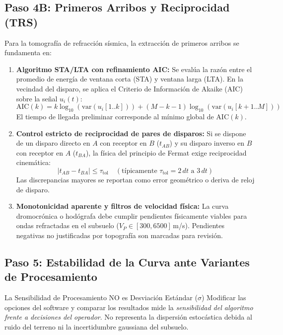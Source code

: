 \documentclass[11pt,a4paper]{article}
\begin{document}
\subsection{Paso 4B: Primeros Arribos y Reciprocidad (TRS)}
Para la tomografía de refracción sísmica, la extracción de primeros arribos se fundamenta en:
\begin{enumerate}
    \item \textbf{Algoritmo STA/LTA con refinamiento AIC:}
    Se evalúa la razón entre el promedio de energía de ventana corta (STA) y ventana larga (LTA). En la vecindad del disparo, se aplica el Criterio de Información de Akaike (AIC) sobre la señal $u_i(t)$:
    \begin{equation}
        \text{AIC}(k) = k \log_{10}(\text{var}(u_i[1..k])) + (M - k - 1) \log_{10}(\text{var}(u_i[k+1..M]))
    \end{equation}
    El tiempo de llegada preliminar corresponde al mínimo global de $\text{AIC}(k)$.
    \item \textbf{Control estricto de reciprocidad de pares de disparos:}
    Si se dispone de un disparo directo en $A$ con receptor en $B$ ($t_{AB}$) y su disparo inverso en $B$ con receptor en $A$ ($t_{BA}$), la física del principio de Fermat exige reciprocidad cinemática:
    \begin{equation}
        |t_{AB} - t_{BA}| \le \tau_{\text{tol}} \quad (\text{típicamente } \tau_{\text{tol}} = 2\,dt \text{ a } 3\,dt)
    \end{equation}
    Las discrepancias mayores se reportan como error geométrico o deriva de reloj de disparo.
    \item \textbf{Monotonicidad aparente y filtros de velocidad física:}
    La curva dromocrónica o hodógrafa debe cumplir pendientes físicamente viables para ondas refractadas en el subsuelo ($V_P \in [300, 6500]$\,m/s). Pendientes negativas no justificadas por topografía son marcadas para revisión.
\end{enumerate}

\subsection{Paso 5: Estabilidad de la Curva ante Variantes de Procesamiento}
\begin{limitbox}{La Sensibilidad de Procesamiento NO es Desviación Estándar ($\sigma$)}
Modificar las opciones del software y comparar los resultados mide la \emph{sensibilidad del algoritmo frente a decisiones del operador}. No representa la dispersión estocástica debida al ruido del terreno ni la incertidumbre gaussiana del subsuelo.
\end{limitbox}
\end{document}
